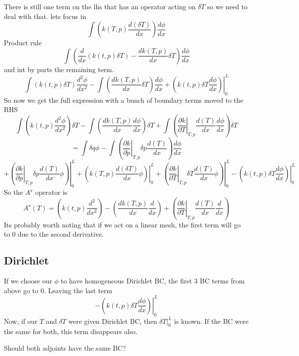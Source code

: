 \documentclass[11pt]{article}
\begin{document}
There is still one term on the lhs that has an operator acting on $\delta T$ so we need to deal with that. lets focus in
\[
\int \left( k(T,p) \frac{d(\delta T)}{dx} \right)\frac{d \phi}{dx}
\] 
Product rule
\[
\int \left( \frac{d}{dx} (k(t,p) \delta T)- \frac{d k(T,p)}{dx}\delta T \right)\frac{d \phi}{dx}
\]
and int by parts the remaining term.
\[
\int \left( k(t,p) \delta T\right)\frac{d^2 \phi}{dx^2}
- \int \left( \frac{d k(T,p)}{dx}\delta T \right)\frac{d \phi}{dx}
+ \left.\left( k(t,p) \delta T \frac{d \phi}{dx}  \right) \right|_0^L
\]
So now we get the full expression with a bunch of boundary terms moved to the RHS 
\[
\int \left( k(t,p) \frac{d^2 \phi}{dx^2} \right) \delta T 
- \int \left( \frac{d k(T,p)}{dx} \frac{d \phi}{dx} \right)\delta T 
+\int \left(\left.\frac{\partial k}{\partial T}\right|_{T,p} \frac{d(T)}{dx} \frac{d \phi}{dx} \right)\delta T
\]
\[
= \int \delta q \phi 
-\int \left(\left.\frac{\partial k}{\partial p}\right|_{T,p}\delta p \frac{d(T)}{dx} \right)\frac{d \phi}{dx}
\]
\[
+ \left. \left(\left.\frac{\partial k}{\partial p}\right|_{T,p}\delta p \frac{d(T)}{dx} \phi \right) \right|_0^L
+ \left. \left( k(T,p) \frac{d(\delta T)}{dx} \phi \right) \right|_0^L 
+ \left. \left(\left.\frac{\partial k}{\partial T}\right|_{T,p}\delta T \frac{d(T)}{dx} \phi \right ) \right|_0^L
- \left.\left( k(t,p) \delta T \frac{d \phi}{dx}  \right) \right|_0^L
\] 
So the $A^\star$ operator is
\[
A^\star (T) = \left( k(t,p) \frac{d^2}{dx^2} \right) 
- \left( \frac{d k(T,p)}{dx} \frac{d}{dx} \right) 
+ \left(\left.\frac{\partial k}{\partial T}\right|_{T,p} \frac{d(T)}{dx} \frac{d}{dx} \right)
\]
Its probably worth noting that if we act on a linear mesh, the first term will go to 0 due to the second derivative.
\subsection{Dirichlet}
If we choose our $\phi$ to have homogeneous Dirichlet BC, the first 3 BC terms from above go to 0. Leaving the last term 
\[
- \left.\left( k(t,p) \delta T \frac{d \phi}{dx}  \right) \right|_0^L
\]
Now, if our $T$ and $\delta T$ were given Dirichlet BC, then $\left. \delta T \right|_0^L$ is known. If the BC were the same for both, this term disappears also.


Should both adjoints have the same BC?
\end{document}
